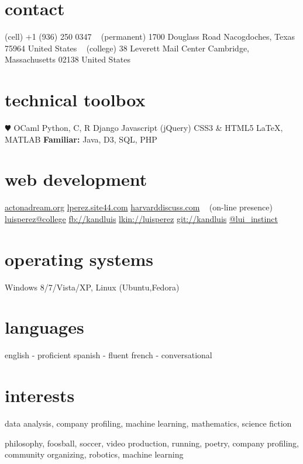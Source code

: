 \documentclass[]{friggeri-cv} %
\begin{document}


\begin{aside} %
\section{contact}
(cell)
+1 (936) 250 0347
~
(permanent)
1700 Douglass Road
Nacogdoches, Texas 75964
United States
~
(college)
38 Leverett Mail Center
Cambridge, Massachusetts 02138
United States
\section{technical toolbox}
{\color{red} $\varheartsuit$} OCaml
Python, C, R
Django
Javascript (jQuery)
CSS3 \& HTML5
\LaTeX, MATLAB
\textbf{Familiar:} Java, D3, SQL, PHP
\section{web development}
\href{http://www.actonadream.org/}{actonadream.org}
\href{http://lperez.site44.com}{lperez.site44.com}
\href{https://www.hcs.harvard.edu/~harvarddiscuss/index.php/en/}{harvarddiscuss.com}
~
(on-line presence)
\href{mailto:luisperez@college.harvard.edu}{luisperez@college}
\href{http://facebook.com/kandluis}{fb://kandluis}
\href{http://www.linkedin.com/pub/luis-perez/73/793/770}{lkin://luisperez}
\href{http://www.github.com/kandluis}{git://kandluis}
\href{http://www.twitter.com/lui\_instinct}{@lui\_instinct}
\section{operating systems}
Windows 8/7/Vista/XP, Linux (Ubuntu,Fedora)
\section{languages}
english - proficient
spanish - fluent
french - conversational
\section{interests}
data analysis, company profiling, machine learning, mathematics, science fiction
\begin{detailed} 
philosophy, foosball, soccer, video production, running, poetry, company profiling,  community organizing, robotics, machine learning
\end{detailed}
\end{aside}
\end{document}
